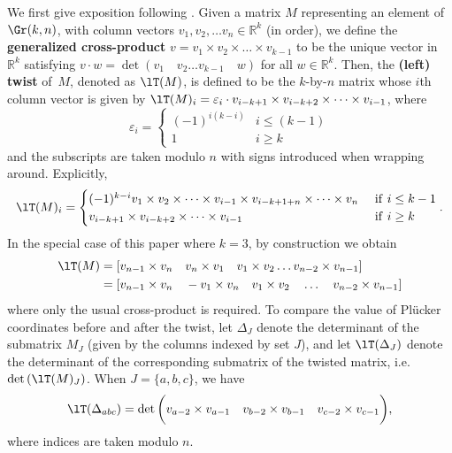 We first give exposition following \cite[Sec. 2]{marshscott2016}.
Given a matrix $M$ representing an element of $\Gr(k,n)$, with column vectors $v_1, v_2, \dots v_n \in \mathbb{R}^k$ (in order), we define the {\bf generalized cross-product} $v = v_1 \times v_2 \times \dots \times v_{k-1}$ to be the unique vector in $\mathbb{R}^k$ satisfying $v \cdot w = \det(v_1 \quad v_2 \dots v_{k-1} \quad w)$ for all $w \in \mathbb{R}^k$.
Then, the
{\bf (left) twist} of~$M$, denoted as $\lT(M)$, is defined to be the $k$-by-$n$ matrix whose $i$th column vector is given by 
$\lT(M)_i =\varepsilon_i \cdot v_{i-k+1} \times v_{i-k+2} \times \dots \times v_{i-1}$, where
\[\varepsilon_i = \begin{cases}
(-1)^{i(k-i)} & i \leq (k-1)\\
1 & i \geq k
\end{cases}\] and
the subscripts are taken modulo $n$ with signs introduced when wrapping around.
Explicitly, 
$$\lT(M)_i = \begin{cases} 
(-1)^{k-i} v_1 \times v_2 \times \dots \times v_{i-1} \times v_{i-k+1+n} \times \dots \times v_n & \mathrm{~if~} i\leq k-1 \\
v_{i-k+1} \times v_{i-k+2} \times \dots \times v_{i-1} & \mathrm{~if~} i\geq k \end{cases}.$$
In the special case of this paper where $k=3$, by construction we obtain
\begin{eqnarray*}
\lT(M) & = [v_{n-1} \times v_n \quad v_n \times v_1 \quad v_1 \times v_2 \dots v_{n-2} \times v_{n-1}]\\
 & = [v_{n-1} \times v_n \quad -v_1 \times v_n \quad v_1 \times v_2 \quad \dots \quad v_{n-2} \times v_{n-1}]
\end{eqnarray*}
where only the usual cross-product is required.
To compare the value of Pl{\"u}cker coordinates before and after the twist, let $\Delta_J$ denote the determinant of the submatrix $M_J$ (given by the columns indexed by set $J$), and let $\lT(\Delta_J)$ denote the determinant of the corresponding submatrix of the twisted matrix, i.e. $\det \left(\lT(M)_{J}\right)$. When $J = \{a,b,c\}$, we have
$$\lT(\Delta_{abc}) = \det \bigg( v_{a-2} \times v_{a-1} \quad v_{b-2} \times v_{b-1} \quad v_{c-2} \times v_{c-1}\bigg),$$
where indices are taken modulo $n$.

